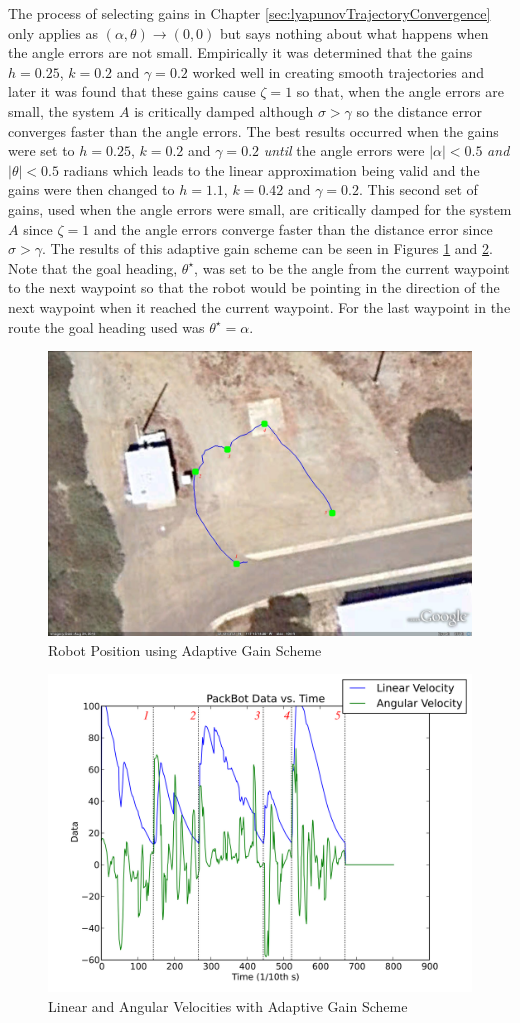 The process of selecting gains in Chapter \ref{sec:lyapunovTrajectoryConvergence} only applies as $(\alpha, \theta)\to(0,0)$ but says nothing about what happens when the angle errors are not small. Empirically it was determined that the gains $h=0.25$, $k=0.2$ and $\gamma=0.2$ worked well in creating smooth trajectories and later it was found that these gains cause $\zeta=1$ so that, when the angle errors are small, the system $A$ is critically damped although $\sigma>\gamma$ so the distance error converges faster than the angle errors. The best results occurred when the gains were set to $h=0.25$, $k=0.2$ and $\gamma=0.2$ \textit{until} the angle errors were $|\alpha|<0.5$ \textit{and} $|\theta|<0.5$ radians which leads to the linear approximation being valid and the gains were then changed to $h=1.1$, $k=0.42$ and $\gamma=0.2$. This second set of gains, used when the angle errors were small, are critically damped for the system $A$ since $\zeta=1$ and the angle errors converge faster than the distance error since $\sigma>\gamma$. The results of this adaptive gain scheme can be seen in Figures \ref{fig:resultsLyapunovPositionAdaptive} and \ref{fig:resultsLyapunovVelocitiesAdaptive}. Note that the goal heading, $\theta^\star$, was set to be the angle from the current waypoint to the next waypoint so that the robot would be pointing in the direction of the next waypoint when it reached the current waypoint. For the last waypoint in the route the goal heading used was $\theta^\star=\alpha$.

\begin{figure}[ht!]
	\centering
	\includegraphics[width=.5\textwidth]{images/GE/20100929_1448_GE_KF_waypts}
	\caption{Robot Position using Adaptive Gain Scheme}
	\label{fig:resultsLyapunovPositionAdaptive}
\end{figure}

\begin{figure}[ht!]
	\centering
	\includegraphics[width=.5\textwidth]{images/pbtx/20100929_1448_pbtx}
	\caption{Linear and Angular Velocities with Adaptive Gain Scheme}
	\label{fig:resultsLyapunovVelocitiesAdaptive}
\end{figure}

